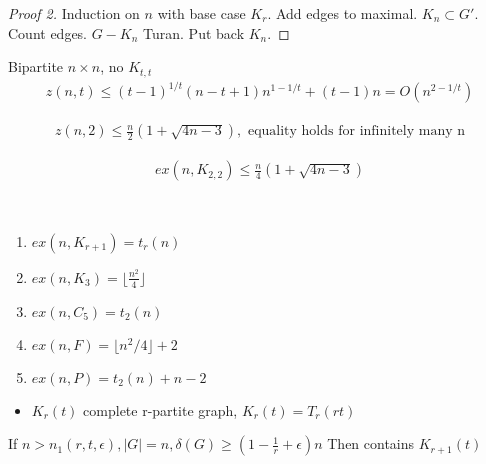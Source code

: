 \begin{proof}[Proof 2]
    Induction on $n$ with base case $K_r$.
    Add edges to maximal. $K_n \subset G'$.
    Count edges.
    $G - K_n$ Turan.
    Put back $K_n$.
\end{proof}

\begin{thm}
    Bipartite $n \times n$, no $K_{t,t}$
    \begin{align*}
        z(n, t) \leq (t - 1)^{1/t}(n - t + 1)n^{1 - 1/t} + (t - 1)n = O(n^{2 - 1/t})
    \end{align*}
\end{thm}

\begin{thm}
    \begin{align*}
        z(n, 2) \leq \frac{n}{2} (1 + \sqrt{4n - 3}), \text{ equality holds for infinitely many n}
    \end{align*}
\end{thm}

\begin{thm}
\begin{align*}
    ex(n, K_{2,2}) \leq \frac{n}{4} (1 + \sqrt{4n - 3})
\end{align*}
\end{thm}

\begin{fact}
    \,
    \begin{enumerate}
        \item $ex(n, K_{r+1}) = t_r(n)$
        \item $ex(n, K_3) = \lfloor\frac{n^2}{4}\rfloor$
        \item $ex(n, C_5) = t_2(n)$
        \item $ex(n, F) = \lfloor n^2 / 4\rfloor + 2$
        \item $ex(n, P) = t_2(n) + n - 2$
    \end{enumerate}
\end{fact}

\begin{itemize}
    \item $K_r(t)$ complete r-partite graph, $K_r(t) = T_r(rt)$
\end{itemize}

\begin{lemma}
    If $n > n_1(r, t, \epsilon), |G| = n, \delta(G) \geq (1 - \frac{1}{r} + \epsilon)n $
    Then contains $K_{r+1}(t)$
\end{lemma}

